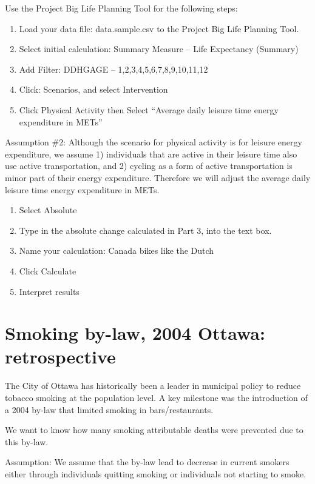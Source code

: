 \documentclass[]{book}
\begin{document}
Use the Project Big Life Planning Tool for the following steps:

\begin{enumerate}
\def\labelenumi{\arabic{enumi}.}
\item
  Load your data file: data.sample.csv to the Project Big Life Planning
  Tool.
\item
  Select initial calculation: Summary Measure -- Life Expectancy
  (Summary)
\item
  Add Filter: DDHGAGE -- 1,2,3,4,5,6,7,8,9,10,11,12
\item
  Click: Scenarios, and select Intervention
\item
  Click Physical Activity then Select ``Average daily leisure time
  energy expenditure in METs''
\end{enumerate}

Assumption \#2: Although the scenario for physical activity is for
leisure energy expenditure, we assume 1) individuals that are active in
their leisure time also use active transportation, and 2) cycling as a
form of active transportation is minor part of their energy expenditure.
Therefore we will adjust the average daily leisure time energy
expenditure in METs.

\begin{enumerate}
\def\labelenumi{\arabic{enumi}.}
\setcounter{enumi}{5}
\item
  Select Absolute
\item
  Type in the absolute change calculated in Part 3, into the text box.
\item
  Name your calculation: Canada bikes like the Dutch
\item
  Click Calculate
\item
  Interpret results
\end{enumerate}

\section{Smoking by-law, 2004 Ottawa:
retrospective}\label{smoking-by-law-2004-ottawa-retrospective}

The City of Ottawa has historically been a leader in municipal policy to
reduce tobacco smoking at the population level. A key milestone was the
introduction of a 2004 by-law that limited smoking in bars/restaurants.

We want to know how many smoking attributable deaths were prevented due
to this by-law.

Assumption: We assume that the by-law lead to decrease in current
smokers either through individuals quitting smoking or individuals not
starting to smoke.
\end{document}
